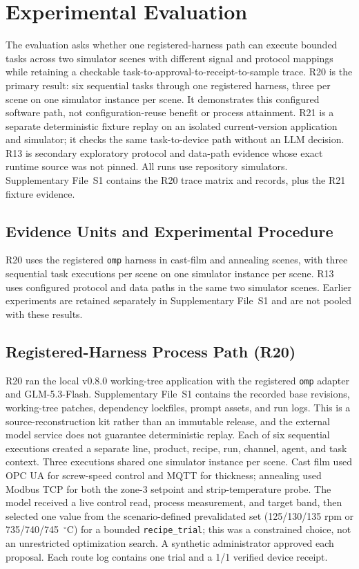 \section{Experimental Evaluation}
\label{sec:eval}
The evaluation asks whether one registered-harness path can execute bounded
tasks across two simulator scenes with different signal and protocol mappings
while retaining a checkable task-to-approval-to-receipt-to-sample trace. R20 is
the primary result: six sequential tasks through one registered harness, three
per scene on one simulator instance per scene. It demonstrates this configured
software path, not configuration-reuse benefit or process attainment. R21 is a
separate deterministic fixture replay on an isolated current-version
application and simulator; it checks the same task-to-device path without an
LLM decision. R13 is secondary exploratory protocol and data-path evidence
whose exact runtime source was not pinned. All runs use repository simulators.
Supplementary File~S1 contains the R20 trace matrix and records, plus the R21
fixture evidence.

\subsection{Evidence Units and Experimental Procedure}
\label{sec:testbed}
\label{sec:procedure}
R20 uses the registered \texttt{omp} harness in cast-film and annealing scenes,
with three sequential task executions per scene on one simulator instance per
scene. R13 uses configured protocol and data paths in the same two simulator
scenes. Earlier experiments are retained separately in Supplementary File~S1
and are not pooled with these results.

\subsection{Registered-Harness Process Path (R20)}
\label{sec:harness-e2e}
R20 ran the local v0.8.0 working-tree application with the registered
\texttt{omp} adapter and GLM-5.3-Flash. Supplementary File~S1 contains the
recorded base revisions, working-tree patches, dependency lockfiles, prompt
assets, and run logs. This is a source-reconstruction kit rather than an
immutable release, and the external model service does not guarantee
deterministic replay. Each of six sequential executions created a separate
line, product, recipe, run, channel, agent, and task context. Three executions
shared one simulator instance per scene. Cast film used OPC UA for screw-speed
control and MQTT for thickness; annealing used Modbus TCP for both the zone-3
setpoint and strip-temperature probe. The model received a live control read,
process measurement, and target band, then selected one value from the
scenario-defined prevalidated set (125/130/135 rpm or 735/740/745~$^{\circ}$C)
for a bounded \texttt{recipe\_trial}; this was a constrained choice, not an
unrestricted optimization search. A synthetic administrator approved each
proposal. Each route log contains one trial and a 1/1 verified device receipt.

